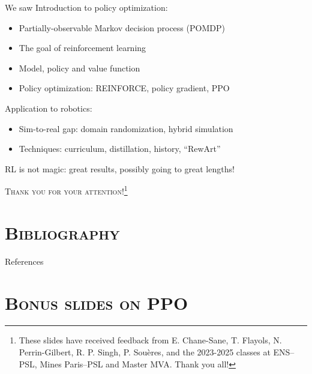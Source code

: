 \documentclass[10pt, aspectratio=1610]{beamer}
\begin{document}
\begin{frame}{We saw}
    Introduction to policy optimization:
    \begin{itemize}
        \item Partially-observable Markov decision process (POMDP)
        \item The goal of reinforcement learning
        \item Model, policy and value function
        \item Policy optimization: REINFORCE, policy gradient, PPO
    \end{itemize}
    Application to robotics:
    \begin{itemize}
        \item Sim-to-real gap: domain randomization, hybrid simulation
        \item Techniques: curriculum, distillation, history, ``RewArt''
    \end{itemize}
    RL is not magic: great results, possibly going to great lengths!
\end{frame}


\begin{frame}[standout]
    \textsc{Thank you for your attention!}\footnote{\color{white}%
        These slides have received feedback from E. Chane-Sane, T. Flayols, N.
        Perrin-Gilbert, R. P. Singh, P. Sou\`{e}res, and the 2023-2025 classes
        at ENS--PSL, Mines Paris--PSL and Master MVA. Thank you all!%
    }
\end{frame}


\section{\textsc{Bibliography}}

\renewcommand*{\bibfont}{\footnotesize}
\begin{frame}[allowframebreaks]{References}
    \printbibliography[heading=none]
\end{frame}


\section{\textsc{Bonus slides on PPO}}
\end{document}
